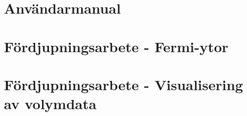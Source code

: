 \documentclass[a4paper,12pt]{article}
\begin{document}
\newpage
{}
\printbibliography{}

\begin{appendices}

\section{Användarmanual}
\label{appendix:användarmanual}





\section{Fördjupningsarbete - Fermi-ytor}
\label{appendix:fermi-ytor}

\section{Fördjupningsarbete - Visualisering av volymdata}
\label{appendix:visualisering}
















\end{appendices}
\end{document}
